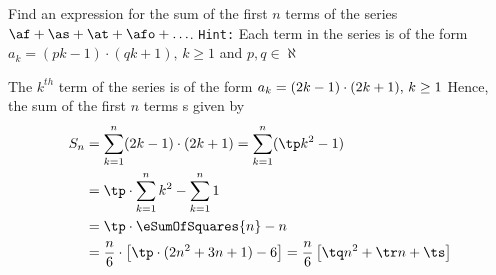 



\gcalcexpr[0]\tp{\vbone * \vbone}
\gcalcexpr[0]
\gcalcexpr[0]
\gcalcexpr[0]

\gcalcexpr[0]
\gcalcexpr[0]
\gcalcexpr[0]
\gcalcexpr[0]

\question[3] Find an expression for the sum of the first $n$ terms of the series 
$\af + \as + \at + \afo + \ldots$. \texttt{Hint:} Each term in the series is of the 
form $a_k = (pk-1)\cdot(qk+1),\, k \geq 1$ and $p,q \in\aleph$

\watchout

\ifprintanswers
\fi 

\begin{solution}[\halfpage]
	The $k^{th}$ term of the series is of the form $a_k = (2 k-1)\cdot(2 k+1),\, k \geq 1$
	Hence, the sum of the first $n$ terms s given by
	\begin{align}
		S_n &= \sum_{k=1}^{n}(\vbone k-1)\cdot(\vbone k+1) = \sum_{k=1}^{n}(\tp k^2-1) \\
		&= \tp\cdot\sum_{k=1}^{n}k^2 - \sum_{k=1}^{n}1 \\
		&= \tp\cdot\eSumOfSquares{n} - n \\
		&= \dfrac{n}{6}\cdot\left[\tp\cdot(2n^2 + 3n + 1) - 6\right] = \dfrac{n}{6}\left[ \tq n^2 + \tr n + \ts \right] 
	\end{align}
\end{solution}
